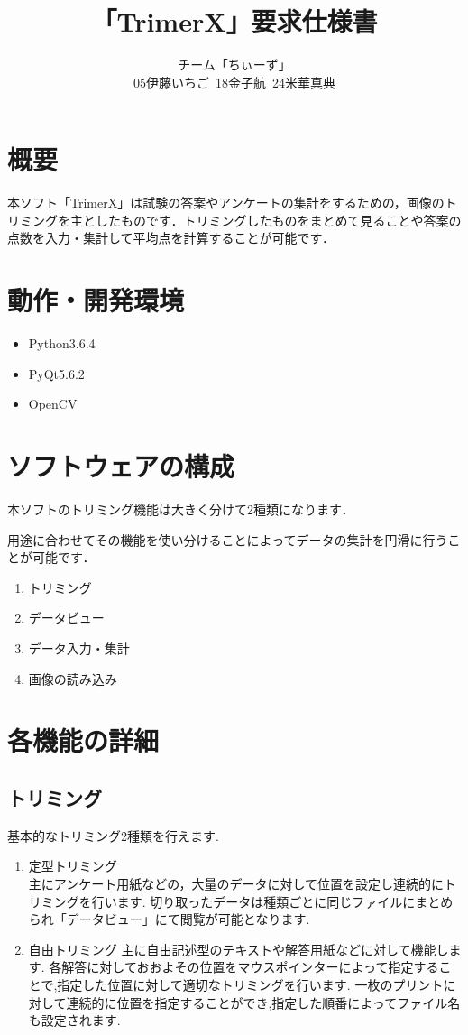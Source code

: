 \documentclass[12pt]{jsreport}
\title{「TrimerX」要求仕様書}
\author{チーム「ちぃーず」\\05伊藤いちご\ 18金子航\ 24米華真典}
\date{}
\begin{document}
\maketitle
\newpage

\tableofcontents

\newpage

\setcounter{page}{1}

\chapter{概要}
本ソフト「TrimerX」は試験の答案やアンケートの集計をするための，画像のトリミングを主としたものです．トリミングしたものをまとめて見ることや答案の点数を入力・集計して平均点を計算することが可能です．
\chapter{動作・開発環境}
\begin{itemize}
    \item Python3.6.4
    \item PyQt5.6.2
    \item OpenCV
\end{itemize}

\chapter{ソフトウェアの構成}
本ソフトのトリミング機能は大きく分けて2種類になります．

用途に合わせてその機能を使い分けることによってデータの集計を円滑に行うことが可能です．
\begin{enumerate}
    \item トリミング
    \item データビュー
    \item データ入力・集計
    \item 画像の読み込み
\end{enumerate}

\chapter{各機能の詳細}


\section{トリミング}
基本的なトリミング2種類を行えます.

\begin{enumerate}
    \item 定型トリミング \\
    主にアンケート用紙などの，大量のデータに対して位置を設定し連続的にトリミングを行います.
    切り取ったデータは種類ごとに同じファイルにまとめられ「データビュー」にて閲覧が可能となります.
    \item 自由トリミング
    主に自由記述型のテキストや解答用紙などに対して機能します.
    各解答に対しておおよその位置をマウスポインターによって指定することで,指定した位置に対して適切なトリミングを行います.
    一枚のプリントに対して連続的に位置を指定することができ,指定した順番によってファイル名も設定されます.

\end{enumerate}
\end{document}

